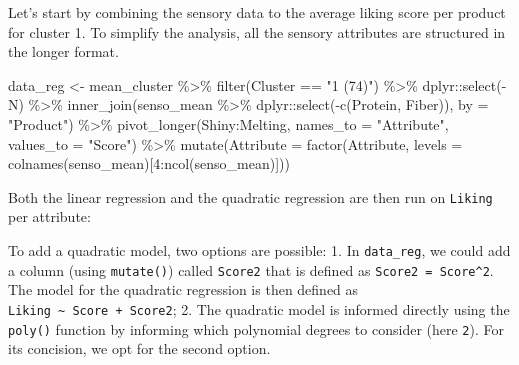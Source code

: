 \documentclass[
]{krantz}
\makeatletter
\newenvironment{Shaded}{\begin{snugshade}}{\end{snugshade}}
\newcommand{\AttributeTok}[1]{\textcolor[rgb]{0.61,0.61,0.61}{#1}}
\newcommand{\DecValTok}[1]{\textcolor[rgb]{0.06,0.06,0.06}{#1}}
\newcommand{\FunctionTok}[1]{\textcolor[rgb]{0,0,0}{#1}}
\newcommand{\NormalTok}[1]{#1}
\newcommand{\OtherTok}[1]{\textcolor[rgb]{0.37,0.37,0.37}{#1}}
\newcommand{\SpecialCharTok}[1]{\textcolor[rgb]{0,0,0}{#1}}
\newcommand{\StringTok}[1]{\textcolor[rgb]{0.5,0.5,0.5}{#1}}
\renewenvironment{quote}{\begin{VF}}{\end{VF}}
\newenvironment{kframe}{%
\medskip{}
\setlength{\fboxsep}{.8em}
 \def\at@end@of@kframe{}%
 \ifinner\ifhmode%
  \def\at@end@of@kframe{\end{minipage}}%
  \begin{minipage}{\columnwidth}%
 \fi\fi%
 \def\FrameCommand##1{\hskip\@totalleftmargin \hskip-\fboxsep
 \colorbox{shadecolor}{##1}\hskip-\fboxsep
     \hskip-\linewidth \hskip-\@totalleftmargin \hskip\columnwidth}%
 \MakeFramed {\advance\hsize-\width
   \@totalleftmargin\z@ \linewidth\hsize
   \@setminipage}}%
 {\par\unskip\endMakeFramed%
 \at@end@of@kframe}
\renewenvironment{Shaded}{\begin{kframe}}{\end{kframe}}
\makeatother
\begin{document}
Let's start by combining the sensory data to the average liking score per product for cluster 1. To simplify the analysis, all the sensory attributes are structured in the longer format.

\begin{Shaded}
\begin{Highlighting}[]
\NormalTok{data\_reg }\OtherTok{\textless{}{-}}\NormalTok{ mean\_cluster }\SpecialCharTok{\%\textgreater{}\%}
  \FunctionTok{filter}\NormalTok{(Cluster }\SpecialCharTok{==} \StringTok{"1 (74)"}\NormalTok{) }\SpecialCharTok{\%\textgreater{}\%}
\NormalTok{  dplyr}\SpecialCharTok{::}\FunctionTok{select}\NormalTok{(}\SpecialCharTok{{-}}\NormalTok{N) }\SpecialCharTok{\%\textgreater{}\%}
  \FunctionTok{inner\_join}\NormalTok{(senso\_mean }\SpecialCharTok{\%\textgreater{}\%}\NormalTok{ dplyr}\SpecialCharTok{::}\FunctionTok{select}\NormalTok{(}\SpecialCharTok{{-}}\FunctionTok{c}\NormalTok{(Protein, Fiber)), }\AttributeTok{by =} \StringTok{"Product"}\NormalTok{) }\SpecialCharTok{\%\textgreater{}\%}
  \FunctionTok{pivot\_longer}\NormalTok{(Shiny}\SpecialCharTok{:}\NormalTok{Melting, }\AttributeTok{names\_to =} \StringTok{"Attribute"}\NormalTok{, }\AttributeTok{values\_to =} \StringTok{"Score"}\NormalTok{) }\SpecialCharTok{\%\textgreater{}\%}
  \FunctionTok{mutate}\NormalTok{(}\AttributeTok{Attribute =} \FunctionTok{factor}\NormalTok{(Attribute, }\AttributeTok{levels =} \FunctionTok{colnames}\NormalTok{(senso\_mean)[}\DecValTok{4}\SpecialCharTok{:}\FunctionTok{ncol}\NormalTok{(senso\_mean)]))}
\end{Highlighting}
\end{Shaded}

Both the linear regression and the quadratic regression are then run on \texttt{Liking} per attribute:

\begin{quote}
To add a quadratic model, two options are possible:
1. In \texttt{data\_reg}, we could add a column (using \texttt{mutate()}) called \texttt{Score2} that is defined as \texttt{Score2\ =\ Score\^{}2}. The model for the quadratic regression is then defined as \texttt{Liking\ \textasciitilde{}\ Score\ +\ Score2};
2. The quadratic model is informed directly using the \texttt{poly()} function by informing which polynomial degrees to consider (here \texttt{2}).
For its concision, we opt for the second option.
\end{quote}
\end{document}
